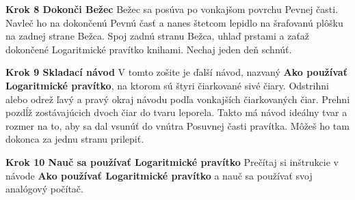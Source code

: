 \begin{multicols*}{3}
{  \textbf{Krok 8 Dokonči Bežec} Bežec sa posúva po vonkajšom povrchu Pevnej časti. Navleč ho na dokončenú Pevnú časť a nanes štetcom lepidlo na šrafovanú plôšku na zadnej strane Bežca. Spoj zadnú stranu Bežca, uhlaď prstami a zaťaž dokončené Logaritmické pravítko knihami. Nechaj jeden deň schnúť.

  \textbf{Krok 9 Skladací návod} V tomto zošite je ďalší návod, nazvaný \textbf{Ako používať Logaritmické pravítko}, na ktorom sú štyri čiarkované sivé čiary. Odstrihni alebo odrež ľavý a pravý okraj návodu podľa vonkajších čiarkovaných čiar. Prehni pozdĺž zostávajúcich dvoch čiar do tvaru leporela. Takto má návod ideálny tvar a rozmer na to, aby sa dal vsunúť do vnútra Posuvnej časti pravítka. Môžeš ho tam dokonca za jednu stranu prilepiť.

  \textbf{Krok 10 Nauč sa používať Logaritmické pravítko} Prečítaj si inštrukcie v návode \textbf{Ako používať Logaritmické pravítko} a nauč sa používať svoj analógový počítač.

  }
  \end{multicols*}
  

